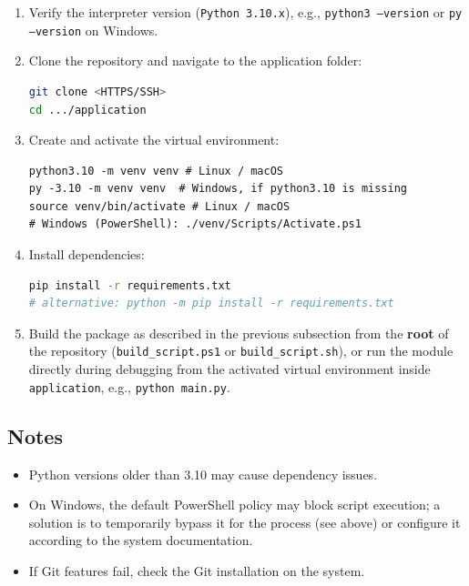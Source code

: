 \documentclass[12pt, a4paper]{article}
\begin{document}
\begin{enumerate}
    \item Verify the interpreter version (\texttt{Python 3.10.x}), e.g., \texttt{python3 --version} or 
    \texttt{py --version} on Windows.
    \item Clone the repository and navigate to the application folder:
\begin{lstlisting}[language=bash, basicstyle=\ttfamily\small]
git clone <HTTPS/SSH>
cd .../application
\end{lstlisting}
    \item Create and activate the virtual environment:
\begin{lstlisting}[basicstyle=\ttfamily\small]
python3.10 -m venv venv # Linux / macOS
py -3.10 -m venv venv  # Windows, if python3.10 is missing
source venv/bin/activate # Linux / macOS
# Windows (PowerShell): ./venv/Scripts/Activate.ps1
\end{lstlisting}
    \item Install dependencies:
\begin{lstlisting}[language=bash, basicstyle=\ttfamily\small]
pip install -r requirements.txt
# alternative: python -m pip install -r requirements.txt
\end{lstlisting}
    \item Build the package as described in the previous subsection from the 
    \textbf{root} of the repository (\texttt{build\_script.ps1} or \texttt{build\_script.sh}), 
    or run the module directly during debugging from the activated virtual environment inside 
    \texttt{application}, e.g., \texttt{python main.py}.
\end{enumerate}

\subsection{Notes}

\begin{itemize}
    \item Python versions older than 3.10 may cause dependency issues.
    \item On Windows, the default PowerShell policy may block script execution; a solution is to 
    temporarily bypass it for the process (see above) or configure it according to the system documentation.
    \item If Git features fail, check the Git installation on the system.
\end{itemize}
\end{document}
